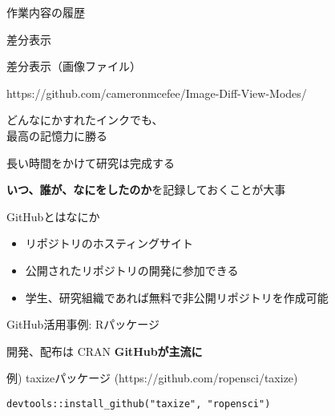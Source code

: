 \documentclass[ignorenonframetext,]{beamer}
\providecommand\faGit{{\FA\symbol{"F1D3}}}
\begin{document}
\begin{frame}{作業内容の履歴}


\end{frame}

\begin{frame}{差分表示}


\end{frame}

\begin{frame}{差分表示（画像ファイル）}

\tiny{https://github.com/cameronmcefee/Image-Diff-View-Modes/}


\end{frame}

\begin{frame}{\Large{どんなにかすれたインクでも、\\最高の記憶力に勝る}}

長い時間をかけて研究は完成する

\faHandLeft \textbf{いつ、誰が、なにをしたのか}を記録しておくことが大事

\end{frame}

\begin{frame}


\end{frame}

\begin{frame}{\faGithub GitHubとはなにか}

\begin{itemize}
\itemsep1pt\parskip0pt
\item
  \textcolor{Orange1}{\faGit}リポジトリのホスティングサイト
\item
  公開されたリポジトリの開発に参加できる
\item
  学生、研究組織であれば無料で非公開リポジトリを作成可能
\end{itemize}

\end{frame}

\begin{frame}{\faGithub GitHub活用事例: \newline Rパッケージ}

開発、配布は \newline CRAN \faArrowRight \textbf{GitHubが主流に}

\tiny{例) taxizeパッケージ (https://github.com/ropensci/taxize)}

\texttt{devtools::install\_github("taxize", "ropensci")}

\end{frame}
\end{document}
